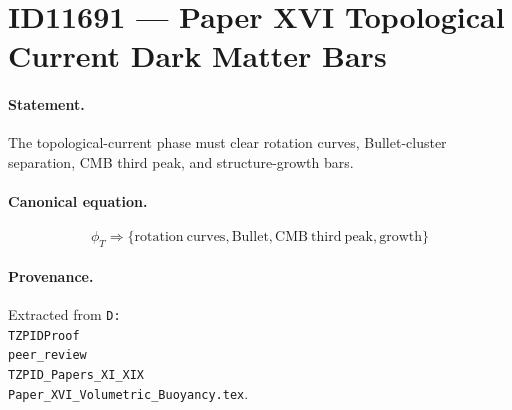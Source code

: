 \section*{ID11691 --- Paper XVI Topological Current Dark Matter Bars}

\paragraph{Statement.}
The topological-current phase must clear rotation curves, Bullet-cluster separation, CMB third peak, and structure-growth bars.

\paragraph{Canonical equation.}
\[
\phi_T\Rightarrow\{\mathrm{rotation\ curves},\mathrm{Bullet},\mathrm{CMB\ third\ peak},\mathrm{growth}\}
\]

\paragraph{Provenance.}
Extracted from \texttt{D:\\TZPIDProof\\peer\_review\\TZPID\_Papers\_XI\_XIX\\Paper\_XVI\_Volumetric\_Buoyancy.tex}.
